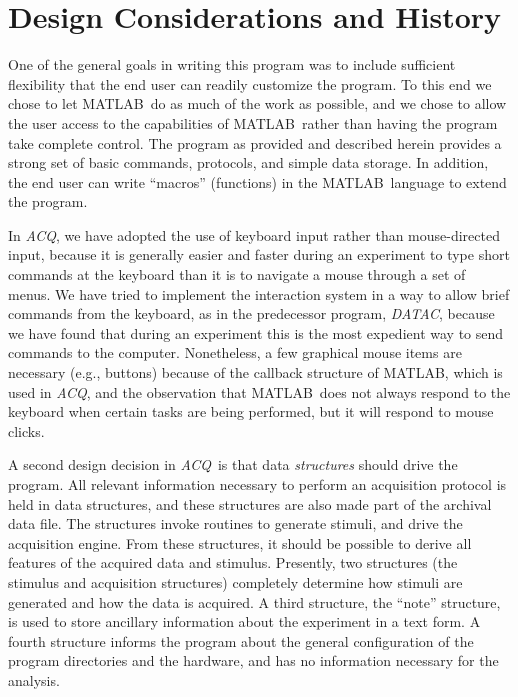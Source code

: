 \documentclass[11pt, letterpaper, titlepage]{paper}
\newcommand{\acq}{\textsl{ACQ}}
\newcommand{\datac}{\textsl{DATAC}}
\newcommand{\ml}{\textsf{MATLAB}}
\begin{document}
\section{Design Considerations and History}
One of the general goals in writing this program was to include sufficient flexibility 
that the end user can readily customize the program. To this end we chose to let \ml\ do 
as much of the work as possible, and we chose to allow the user access to the 
capabilities of \ml\ rather than having the program take complete control. The program as 
provided and described herein provides a strong set of basic commands, protocols, and 
simple data storage. In addition, the end user can write ``macros'' (functions) in the 
\ml\ language to extend the program.

In \acq, we have adopted the use of keyboard input rather than mouse-directed input, 
because it is generally easier and faster during an experiment to type short commands at 
the keyboard than it is to navigate a mouse through a set of menus. We have tried to 
implement the interaction system in a way to allow brief commands from the keyboard, as 
in the predecessor program, \datac, because we have found that during an experiment this 
is the most expedient way to send commands to the computer. Nonetheless, a few graphical 
mouse items are necessary (e.g., buttons) because of the callback structure of \ml, which 
is used in \acq, and the observation that \ml\ does not always respond to the keyboard 
when certain tasks are being performed, but it will respond to mouse clicks.

A second design decision in \acq\ is that data \textit{structures}  
should drive the program. All relevant information necessary to perform an acquisition 
protocol is held in data structures, and these structures are also made part of the 
archival data file. The structures invoke routines to generate stimuli, and drive the 
acquisition engine. From these structures, it should be possible to derive all features 
of the acquired data and stimulus. Presently, two structures (the stimulus and 
acquisition structures) completely determine how stimuli are generated and how the data 
is acquired. A third structure, the ``note'' structure, is used to store ancillary 
information about the experiment in a text form. A fourth structure informs the program 
about the general configuration of the program directories and the hardware, and has no 
information necessary for the analysis.
\end{document}
